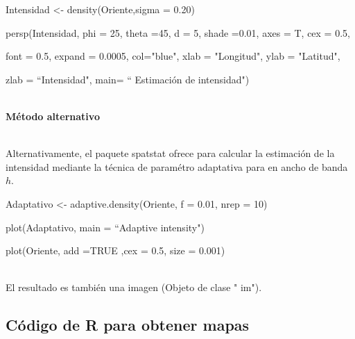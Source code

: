 \documentclass[12pt]{report}
\begin{document}
{{{{{{		{ \scriptsize { \ttfamily 
				
				
				Intensidad <- density(Oriente,sigma = 0.20)  
				
				persp(Intensidad, phi = 25, theta =45, d = 5, shade =0.01, axes = T, cex = 0.5, 
				
				font = 0.5, expand = 0.0005, col="blue", xlab = "Longitud", ylab = "Latitud", \vspace{-0,15 cm}  
				
				zlab = “Intensidad", main= “ Estimación de intensidad")  	} }\\
		
		
		
		
	     	

 
		
		
		
		\textbf{Método alternativo }{\label{Pesrs}\\
				
		Alternativamente, el paquete  spatstat ofrece para calcular la estimación de la  intensidad mediante la técnica de paramétro adaptativa para en ancho de banda $h.$	\\	
		
	
		{ \scriptsize  { \ttfamily   
				
				Adaptativo <- adaptive.density(Oriente, f = 0.01, nrep = 10)  	
			
				plot(Adaptativo, main = “Adaptive intensity")	\vspace{-0.15cm}   
				
				plot(Oriente, add =TRUE ,cex = 0.5, size = 0.001)         }}   \\
			  
			El resultado es también una imagen (Objeto de clase "\! im").\\
			
		
	
		
				
			           
			
		
		
		
  

					
				
				\subsection{Código de R para obtener mapas}{\label{R1} }
				
}}}}}}}
\end{document}
